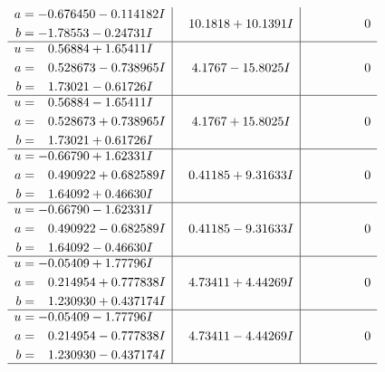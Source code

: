\documentclass[1p]{elsarticle_modified}
\theoremstyle{definition}
\begin{document}
$$\begin{array}{c|c|c}
\begin{aligned}
a &= -0.676450 - 0.114182 I \\
b &= -1.78553 - 0.24731 I\end{aligned}
 & \phantom{-}10.1818 + 10.1391 I & \phantom{-0.000000 } 0 \\ \hline\begin{aligned}
u &= \phantom{-}0.56884 + 1.65411 I \\
a &= \phantom{-}0.528673 - 0.738965 I \\
b &= \phantom{-}1.73021 - 0.61726 I\end{aligned}
 & \phantom{-}4.1767 - 15.8025 I & \phantom{-0.000000 } 0 \\ \hline\begin{aligned}
u &= \phantom{-}0.56884 - 1.65411 I \\
a &= \phantom{-}0.528673 + 0.738965 I \\
b &= \phantom{-}1.73021 + 0.61726 I\end{aligned}
 & \phantom{-}4.1767 + 15.8025 I & \phantom{-0.000000 } 0 \\ \hline\begin{aligned}
u &= -0.66790 + 1.62331 I \\
a &= \phantom{-}0.490922 + 0.682589 I \\
b &= \phantom{-}1.64092 + 0.46630 I\end{aligned}
 & \phantom{-}0.41185 + 9.31633 I & \phantom{-0.000000 } 0 \\ \hline\begin{aligned}
u &= -0.66790 - 1.62331 I \\
a &= \phantom{-}0.490922 - 0.682589 I \\
b &= \phantom{-}1.64092 - 0.46630 I\end{aligned}
 & \phantom{-}0.41185 - 9.31633 I & \phantom{-0.000000 } 0 \\ \hline\begin{aligned}
u &= -0.05409 + 1.77796 I \\
a &= \phantom{-}0.214954 + 0.777838 I \\
b &= \phantom{-}1.230930 + 0.437174 I\end{aligned}
 & \phantom{-}4.73411 + 4.44269 I & \phantom{-0.000000 } 0 \\ \hline\begin{aligned}
u &= -0.05409 - 1.77796 I \\
a &= \phantom{-}0.214954 - 0.777838 I \\
b &= \phantom{-}1.230930 - 0.437174 I\end{aligned}
 & \phantom{-}4.73411 - 4.44269 I & \phantom{-0.000000 } 0\\
 \hline 
 \end{array}$$\newpage\newpage\renewcommand{\arraystretch}{1}
\end{document}
